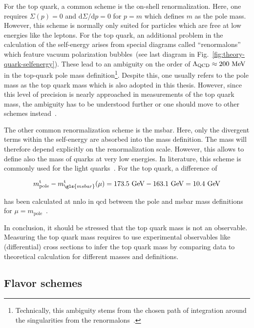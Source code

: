 For the top quark, a common scheme is the on-shell renormalization. Here, one requires $\Sigma(p)=0$ and $\mathrm{d}\Sigma/\mathrm{d}p=0$ for $p=m$ which defines $m$ as the pole mass. However, this scheme is normally only suited for particles which are free at low energies like the leptons. For the top quark, an additional problem in the calculation of the self-energy arises from special diagrams called ``renormalons'' which feature vacuum polarization bubbles~(see last diagram in Fig.~\ref{fig:theory-quark-selfenergy}). These lead to an ambiguity on the order of $\Lambda_\mathrm{QCD}\approx200~\mathrm{MeV}$ in the top-quark pole mass definition\footnote{Technically, this ambiguity stems from the chosen path of integration around the singularities from the renormalons~\cite{Smith:1996xz}.}. Despite this, one usually refers to the pole mass as the top quark mass which is also adopted in this thesis. However, since this level of precision is nearly approached in measurements of the top quark mass, the ambiguity has to be understood further or one should move to other schemes instead~\cite{Smith:1996xz}.

The other common renormalization scheme is the \gls{msbar}. Here, only the divergent terms within the self-energy are absorbed into the mass definition. The mass will therefore depend explicitly on the renormalization scale. However, this allows to define also the mass of quarks at very low energies. In literature, this scheme is commonly used for the light quarks~\cite{Olive:2016xmw}. For the top quark, a difference of

\begin{equation}
m_\mathrm{pole}^\mathrm{t}-m_{\gls{msbar}}^\mathrm{t}(\mu)=173.5~\GeV-163.1~\GeV=10.4~\GeV
\end{equation}

has been calculated at \gls{nnlo} in \gls{qcd} between the pole and \gls{msbar} mass definitions for $\mu=m_\mathrm{pole}$~\cite{Jegerlehner:2012kn}.

In conclusion, it should be stressed that the top quark mass is not an observable. Measuring the top quark mass requires to use experimental observables like (differential) cross sections to infer the top quark mass by comparing data to theoretical calculation for different masses and definitions. 


\subsection{Flavor schemes}

